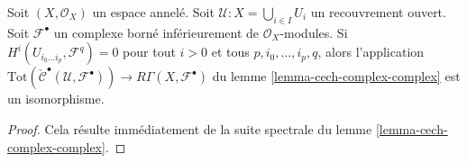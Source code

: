 \begin{lemma}

\label{lemma-cech-complex-complex-computes}
Soit $(X, \mathcal{O}_X)$ un espace annelé. Soit $\mathcal{U} : X = \bigcup_{i \in I} U_i$ un recouvrement ouvert. Soit $\mathcal{F}^\bullet$ un complexe borné inférieurement de $\mathcal{O}_X$-modules. Si $H^i(U_{i_0 \ldots i_p}, \mathcal{F}^q) = 0$ pour tout $i > 0$ et tous $p, i_0, \ldots, i_p, q$, alors l'application $
\text{Tot}(\check{\mathcal{C}}^\bullet(\mathcal{U}, \mathcal{F}^\bullet))
\to
R\Gamma(X, \mathcal{F}^\bullet)
$ du lemme \ref{lemma-cech-complex-complex} est un isomorphisme.
\end{lemma}

\begin{proof}
Cela résulte immédiatement de la suite spectrale du lemme \ref{lemma-cech-complex-complex}.
\end{proof}

